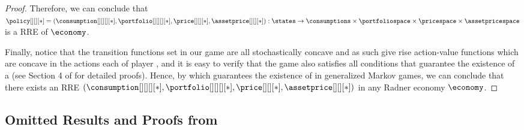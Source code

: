 \begin{proof}
Therefore, we can conclude that $\policy[][][*]=(\consumption[][][][*], \portfolio[][][][*], \price[][][*], \assetprice[][][*]): \states \to \consumptions \times \portfoliospace \times \pricespace
\times \assetpricespace $ is a RRE of $\economy$.

Finally, notice that the transition functions set in our game are all stochastically concave and as such give rise action-value functions which are concave in the actions each of player \cite{atakan2003stochastic}, and it is easy to verify that the game also satisfies all conditions that guarantee the existence of a \MPGNE{} (see Section 4 of \cite{atakan2003stochastic} for detailed proofs). Hence, by  which guarantees the existence of \MPGNE{} in generalized Markov games, we can conclude that there exists an RRE $(\consumption[][][][*], \portfolio[][][][*], \price[][][*], \assetprice[][][*])$ in any Radner economy $\economy$.
\end{proof}


\subsection{Omitted Results and Proofs from }


